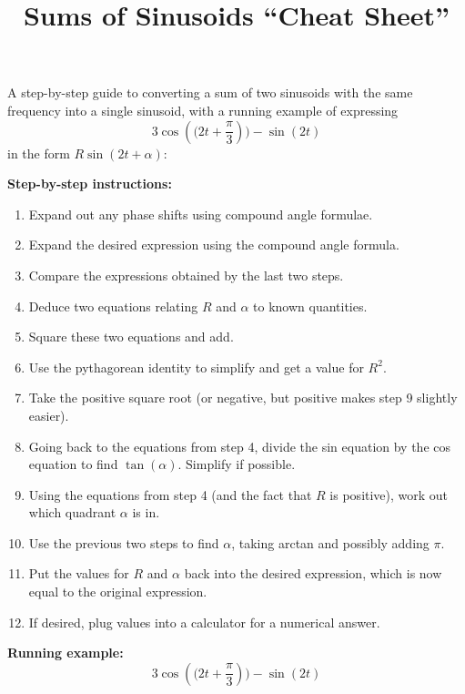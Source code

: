 \documentclass{article}
\begin{document}
\title{Sums of Sinusoids ``Cheat Sheet''}
\date{}

\maketitle
\thispagestyle{empty}


\Large

A step-by-step guide to converting a sum of two sinusoids with the same frequency into a single sinusoid, with a running example of expressing
\[3\cos\left((2t+\frac{\pi}{3}\right))-\sin(2t)\]
in the form $R\sin(2t+\alpha)$:

\vspace{5mm}


\textbf{Step-by-step instructions:}

\begin{enumerate}
\item Expand out any phase shifts using compound angle formulae.
\item Expand the desired expression using the compound angle formula.
\item Compare the expressions obtained by the last two steps.
\item Deduce two equations relating $R$ and $\alpha$ to known quantities.
\item Square these two equations and add.
\item Use the pythagorean identity to simplify and get a value for $R^2$.
\item Take the positive square root (or negative, but positive makes step 9 slightly easier).
\item Going back to the equations from step 4, divide the sin equation by the cos equation to find $\tan(\alpha)$. Simplify if possible.
\item Using the equations from step 4 (and the fact that $R$ is positive), work out which quadrant $\alpha$ is in.
\item Use the previous two steps to find $\alpha$, taking arctan and possibly adding $\pi$.
\item Put the values for $R$ and $\alpha$ back into the desired expression, which is now equal to the original expression.
\item If desired, plug values into a calculator for a numerical answer.
\end{enumerate}

\clearpage



\textbf{Running example:}
\[3\cos\left((2t+\frac{\pi}{3}\right))-\sin(2t)\]
\end{document}
